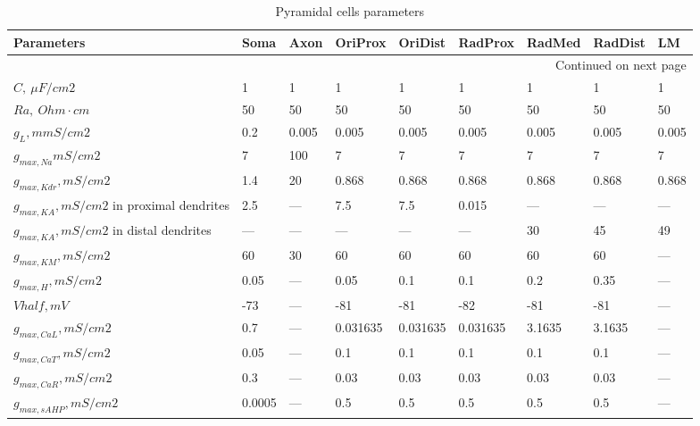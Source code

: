 \begin{longtable}{lllllllll}
\caption{Pyramidal cells parameters}
\label{tabel:ca1_pyramidal_cell_parameters}\\
\toprule
Parameters &     Soma &   Axon &   OriProx &   OriDist &   RadProx &  RadMed & RadDist &     LM \\
\midrule
\endhead
\midrule
\multicolumn{9}{r}{{Continued on next page}} \\
\midrule
\endfoot

\bottomrule
\endlastfoot
$C, \ \mu F/cm2$ &        1 &      1 &         1 &         1 &         1 &       1 &       1 &      1 \\
$Ra, \ Ohm \cdot cm$ &       50 &     50 &        50 &        50 &        50 &      50 &      50 &     50 \\
$g_L,mmS/cm2$ &      0.2 &  0.005 &     0.005 &     0.005 &     0.005 &   0.005 &   0.005 &  0.005 \\
$g_{max, Na} mS/cm2$ &        7 &    100 &         7 &         7 &         7 &       7 &       7 &      7 \\
$g_{max, Kdr}, mS/cm2$ &      1.4 &     20 &     0.868 &     0.868 &     0.868 &   0.868 &   0.868 &  0.868 \\
$ g_{max, KA}, mS/cm2$ in proximal dendrites&      2.5 &    --- &       7.5 &       7.5 &     0.015 &     --- &     --- &    --- \\
$g_{max, KA}, mS/cm2$ in distal dendrites &      --- &    --- &       --- &       --- &       --- &      30 &      45 &     49 \\
$g_{max, KM}, mS/cm2 $ &       60 &     30 &        60 &        60 &        60 &      60 &      60 &    --- \\
$ g_{max, H}, mS/cm2 $ &     0.05 &    --- &      0.05 &       0.1 &       0.1 &     0.2 &    0.35 &    --- \\
$ Vhalf, mV$ &      -73 &    --- &       -81 &       -81 &       -82 &     -81 &     -81 &    --- \\
$g_{max, CaL}, mS/cm2 $ &      0.7 &    --- &  0.031635 &  0.031635 &  0.031635 &  3.1635 &  3.1635 &    --- \\
$g_{max, CaT}, mS/cm2 $ &     0.05 &    --- &       0.1 &       0.1 &       0.1 &     0.1 &     0.1 &    --- \\
$g_{max, CaR}, mS/cm2 $ &      0.3 &    --- &      0.03 &      0.03 &      0.03 &    0.03 &    0.03 &    --- \\
$g_{max, sAHP}, mS/cm2 $ &   0.0005 &    --- &       0.5 &       0.5 &       0.5 &     0.5 &     0.5 &    --- \\

\end{longtable}
